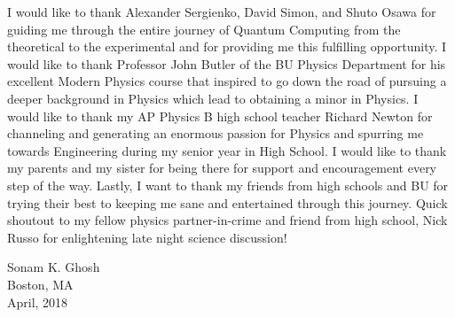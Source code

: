 I would like to thank Alexander Sergienko, David Simon, and Shuto Osawa for guiding me through the entire journey of Quantum Computing from the theoretical to the experimental and for providing me this fulfilling opportunity. I would like to thank Professor John Butler of the BU Physics Department for his excellent Modern Physics course that inspired to go down the road of pursuing a deeper background in Physics which lead to obtaining a minor in Physics. I would like to thank my AP Physics B high school teacher Richard Newton for channeling and generating an enormous passion for Physics and spurring me towards Engineering during my senior year in High School. I would like to thank my parents and my sister for being there for support and encouragement every step of the way. Lastly, I want to thank my friends from high schools and BU for trying their best to keeping me sane and entertained through this journey. Quick shoutout to my fellow physics partner-in-crime and friend from high school, Nick Russo for enlightening late night science discussion!

\vskip 1in

\noindent
Sonam K. Ghosh\\
Boston, MA\\
April, 2018